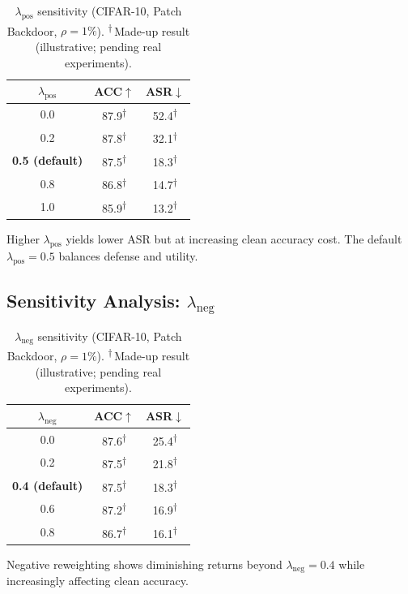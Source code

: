 \documentclass[11pt,a4paper]{article}
\newcommand{\madeupresult}[1]{\textcolor{madeup}{#1\textsuperscript{$\dagger$}}}
\newcommand{\daggernote}{\textsuperscript{$\dagger$}\,\textcolor{madeup}{Made-up result (illustrative; pending real experiments).}}
\begin{document}
\begin{table}[h]
\centering
\caption{$\lambda_{\text{pos}}$ sensitivity (CIFAR-10, Patch Backdoor, $\rho\!=\!1\%$). \daggernote}
\label{tab:lambda_pos}
\begin{tabular}{@{}ccc@{}}
\toprule
$\lambda_{\text{pos}}$ & ACC$\uparrow$ & ASR$\downarrow$ \\
\midrule
0.0 & \madeupresult{87.9} & \madeupresult{52.4} \\
0.2 & \madeupresult{87.8} & \madeupresult{32.1} \\
\textbf{0.5 (default)} & \madeupresult{87.5} & \madeupresult{18.3} \\
0.8 & \madeupresult{86.8} & \madeupresult{14.7} \\
1.0 & \madeupresult{85.9} & \madeupresult{13.2} \\
\bottomrule
\end{tabular}
\end{table}

Higher $\lambda_{\text{pos}}$ yields lower ASR but at increasing clean accuracy
cost.  The default $\lambda_{\text{pos}}=0.5$ balances defense and utility.

\subsection{Sensitivity Analysis: $\lambda_{\text{neg}}$}

\begin{table}[h]
\centering
\caption{$\lambda_{\text{neg}}$ sensitivity (CIFAR-10, Patch Backdoor, $\rho\!=\!1\%$). \daggernote}
\label{tab:lambda_neg}
\begin{tabular}{@{}ccc@{}}
\toprule
$\lambda_{\text{neg}}$ & ACC$\uparrow$ & ASR$\downarrow$ \\
\midrule
0.0 & \madeupresult{87.6} & \madeupresult{25.4} \\
0.2 & \madeupresult{87.5} & \madeupresult{21.8} \\
\textbf{0.4 (default)} & \madeupresult{87.5} & \madeupresult{18.3} \\
0.6 & \madeupresult{87.2} & \madeupresult{16.9} \\
0.8 & \madeupresult{86.7} & \madeupresult{16.1} \\
\bottomrule
\end{tabular}
\end{table}

Negative reweighting shows diminishing returns beyond $\lambda_{\text{neg}}=0.4$
while increasingly affecting clean accuracy.
\end{document}
